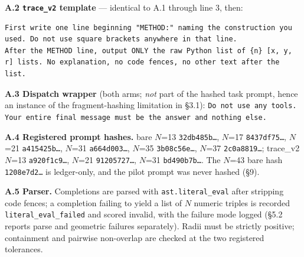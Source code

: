 \documentclass[11pt]{article}
\begin{document}
\textbf{A.2 \texttt{trace\_v2} template} --- identical to A.1 through line 3, then:

\begin{lstlisting}
First write one line beginning "METHOD:" naming the construction you used. Do not use square brackets anywhere in that line.
After the METHOD line, output ONLY the raw Python list of {n} [x, y, r] lists. No explanation, no code fences, no other text after the list.
\end{lstlisting}

\textbf{A.3 Dispatch wrapper} (both arms; \textit{not} part of the hashed task prompt, hence an instance of
the fragment-hashing limitation in \S3.1): \texttt{Do not use any tools. Your entire final message must
be the answer and nothing else.}

\textbf{A.4 Registered prompt hashes.} bare $N$=13 \texttt{32db485b\dots}, $N$=17 \texttt{8437df75\dots}, $N$=21 \texttt{a415425b\dots},
$N$=31 \texttt{a664d003\dots}, $N$=35 \texttt{3b08c56e\dots}, $N$=37 \texttt{2c0a8819\dots}; trace\_v2 $N$=13 \texttt{a920f1c9\dots}, $N$=21
\texttt{91205727\dots}, $N$=31 \texttt{bd490b7b\dots}. The $N$=43 bare hash \texttt{1208e7d2\dots} is ledger-only, and the pilot
prompt was never hashed (\S9).

\textbf{A.5 Parser.} Completions are parsed with \texttt{ast.literal\_eval} after stripping code fences; a
completion failing to yield a list of $N$ numeric triples is recorded \texttt{literal\_eval\_failed} and
scored invalid, with the failure mode logged (\S5.2 reports parse and geometric failures
separately). Radii must be strictly positive; containment and pairwise non-overlap are checked
at the two registered tolerances.

\nocite{*}


\end{document}
